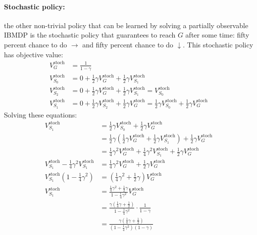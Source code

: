 \paragraph{Stochastic policy:} the other non-trivial policy that can be learned by solving a partially observable IBMDP is the stochastic policy that guarantees to reach $G$ after some time: fifty percent chance to do $\rightarrow$ and fifty percent chance to do $\downarrow$.
This stochastic policy has objective value:
\begin{align*}
    V^{\text{stoch}}_G &= \frac{1}{1-\gamma} \\
    V^{\text{stoch}}_{S_0} &= 0 + \frac{1}{2}\gamma V^{\text{stoch}}_G + \frac{1}{2}\gamma V^{\text{stoch}}_{S_1} \\
    V^{\text{stoch}}_{S_2} &= 0 + \frac{1}{2}\gamma V^{\text{stoch}}_G + \frac{1}{2}\gamma V^{\text{stoch}}_{S_1} = V^{\text{stoch}}_{S_0} \\
    V^{\text{stoch}}_{S_1} &= 0 + \frac{1}{2}\gamma V^{\text{stoch}}_{S_2} + \frac{1}{2}\gamma V^{\text{stoch}}_G = \frac{1}{2}\gamma V^{\text{stoch}}_{S_0} + \frac{1}{2}\gamma V^{\text{stoch}}_G
\end{align*}
Solving these equations:
\begin{align*}
    V^{\text{stoch}}_{S_1} &= \frac{1}{2}\gamma V^{\text{stoch}}_{S_0} + \frac{1}{2}\gamma V^{\text{stoch}}_G \\
    &= \frac{1}{2}\gamma (\frac{1}{2}\gamma V^{\text{stoch}}_G + \frac{1}{2}\gamma V^{\text{stoch}}_{S_1}) + \frac{1}{2}\gamma V^{\text{stoch}}_G \\
    &= \frac{1}{4}\gamma^2 V^{\text{stoch}}_G + \frac{1}{4}\gamma^2 V^{\text{stoch}}_{S_1} + \frac{1}{2}\gamma V^{\text{stoch}}_G \\
    V^{\text{stoch}}_{S_1} - \frac{1}{4}\gamma^2 V^{\text{stoch}}_{S_1} &= \frac{1}{4}\gamma^2 V^{\text{stoch}}_G + \frac{1}{2}\gamma V^{\text{stoch}}_G \\
    V^{\text{stoch}}_{S_1}(1 - \frac{1}{4}\gamma^2) &= (\frac{1}{4}\gamma^2 + \frac{1}{2}\gamma) V^{\text{stoch}}_G \\
    V^{\text{stoch}}_{S_1} &= \frac{\frac{1}{4}\gamma^2 + \frac{1}{2}\gamma}{1 - \frac{1}{4}\gamma^2} V^{\text{stoch}}_G \\
    &= \frac{\gamma(\frac{1}{4}\gamma + \frac{1}{2})}{1 - \frac{1}{4}\gamma^2} \cdot \frac{1}{1-\gamma} \\
    &= \frac{\gamma(\frac{1}{4}\gamma + \frac{1}{2})}{(1 - \frac{1}{4}\gamma^2)(1-\gamma)}
\end{align*}
